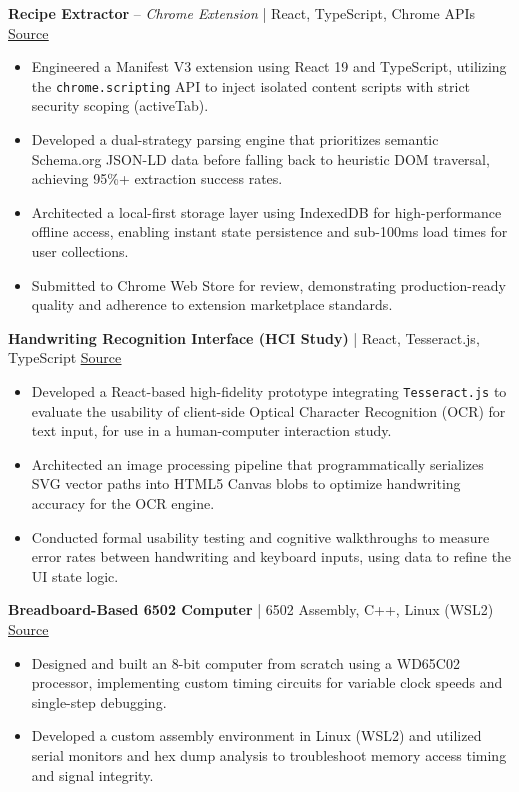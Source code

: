\documentclass[11pt]{article}
\begin{document}
\textbf{Recipe Extractor} -- \textit{Chrome Extension} | React, TypeScript, Chrome APIs \hfill \href{https://github.com/isaac-preyser/react-recipe-extractor}{\underline{Source \faGithub}}
\begin{itemize}
    \item Engineered a Manifest V3 extension using React 19 and TypeScript, utilizing the \texttt{chrome.scripting} API to inject isolated content scripts with strict security scoping (activeTab).
    \item Developed a dual-strategy parsing engine that prioritizes semantic Schema.org JSON-LD data before falling back to heuristic DOM traversal, achieving 95\%+ extraction success rates.
    \item Architected a local-first storage layer using IndexedDB for high-performance offline access, enabling instant state persistence and sub-100ms load times for user collections.
    \item Submitted to Chrome Web Store for review, demonstrating production-ready quality and adherence to extension marketplace standards.
\end{itemize}

\vspace{6pt}

\textbf{Handwriting Recognition Interface (HCI Study)} | React, Tesseract.js, TypeScript \hfill \href{https://github.com/isaac-preyser/seng310-project}{\underline{Source \faGithub}}
\begin{itemize}
  \item Developed a React-based high-fidelity prototype integrating \texttt{Tesseract.js} to evaluate the usability of client-side Optical Character Recognition (OCR) for text input, for use in a human-computer interaction study.
  \item Architected an image processing pipeline that programmatically serializes SVG vector paths into HTML5 Canvas blobs to optimize handwriting accuracy for the OCR engine.
  \item Conducted formal usability testing and cognitive walkthroughs to measure error rates between handwriting and keyboard inputs, using data to refine the UI state logic.
\end{itemize}

\vspace{6pt}

\textbf{Breadboard-Based 6502 Computer} | 6502 Assembly, C++, Linux (WSL2) \hfill \href{https://github.com/isaac-preyser/breadboard-computer-stuff}{\underline{Source \faGithub}}
\begin{itemize}
  \item Designed and built an 8-bit computer from scratch using a WD65C02 processor, implementing custom timing circuits for variable clock speeds and single-step debugging.
  \item Developed a custom assembly environment in Linux (WSL2) and utilized serial monitors and hex dump analysis to troubleshoot memory access timing and signal integrity.
\end{itemize}
\end{document}
